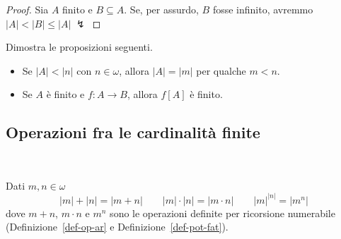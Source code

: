 \begin{proof}
	Sia $A$ finito e $B \subseteq A$. Se, per assurdo, $B$ fosse
infinito, avremmo $|A|<|B|\le|A|\;\lightning$
\end{proof}

\begin{exercise}
	\label{disuguaglianze_senza_AC1}
	Dimostra le proposizioni seguenti.
	\begin{itemize}
		\item Se $|A| < |n|$ con $n \in \omega$, allora $|A| = |m|$ per qualche $m < n$.
		\item Se $A$ \`e finito e $f\colon A \rightarrow B$, allora $f[A]$ \`e finito.
	\end{itemize}	
\end{exercise}

\subsection{Operazioni fra le cardinalit\`a finite}

\ 

\begin{proposition}
	\label{op_card_fin}
	Dati $m,n \in \omega$
	\[ |m| + |n| = |m+n| \qquad |m|\cdot|n| = |m \cdot n| \qquad |m|^{|n|} = |m^n|
		\]
	dove $m+n$, $m\cdot n$ e $m^n$ sono le operazioni definite per
ricorsione numerabile (Definizione~\ref{def-op-ar} e
Definizione~\ref{def-pot-fat}).
\end{proposition}


